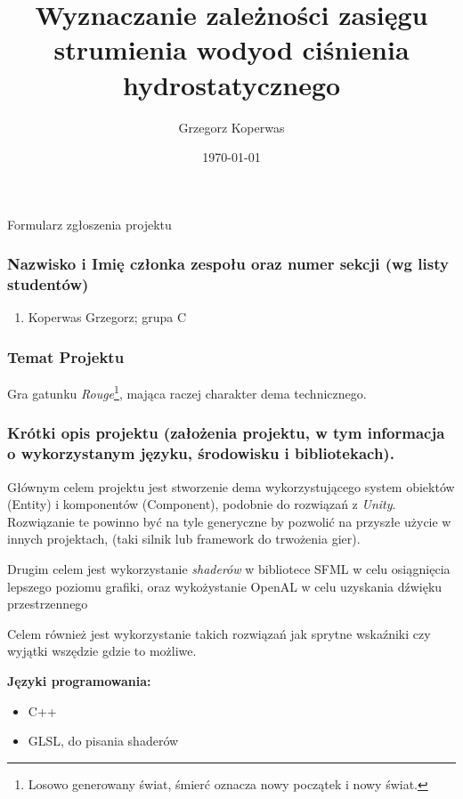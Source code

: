 \documentclass[a4paper,12pt]{article}
\title{Wyznaczanie zależności zasięgu strumienia wodyod ciśnienia hydrostatycznego}
\author{Grzegorz Koperwas}
\date{\today}
\begin{document}
\begin{center}
    \begin{Large}
        Formularz zgłoszenia projektu
    \end{Large}
\end{center}

\subsubsection*{Nazwisko i Imię członka zespołu oraz numer sekcji (wg listy studentów)}

\begin{enumerate}
    \item Koperwas Grzegorz; grupa C
\end{enumerate}

\subsubsection*{Temat Projektu}

Gra gatunku \emph{Rouge}\footnote{Losowo generowany świat, śmierć oznacza nowy początek i nowy świat.}, mająca raczej charakter dema technicznego.

\subsubsection*{Krótki opis projektu (założenia projektu, w tym informacja o wykorzystanym języku, środowisku i bibliotekach).}

Głównym celem projektu jest stworzenie dema wykorzystującego system obiektów (Entity) i komponentów (Component), podobnie do rozwiązań z \emph{Unity}. Rozwiązanie te powinno być na tyle generyczne by pozwolić na przyszłe użycie w innych projektach, (taki silnik lub framework do trwożenia gier).

Drugim celem jest wykorzystanie \emph{shaderów} w bibliotece SFML w celu
osiągnięcia lepszego poziomu grafiki, oraz wykożystanie OpenAL w celu uzyskania
dźwięku przestrzennego

Celem również jest wykorzystanie takich rozwiązań jak sprytne wskaźniki czy wyjątki wszędzie gdzie to możliwe.
\vspace{5mm}

\textbf{Języki programowania:}
\begin{itemize}
    \item C++
    \item GLSL, do pisania shaderów
\end{itemize}
\end{document}
